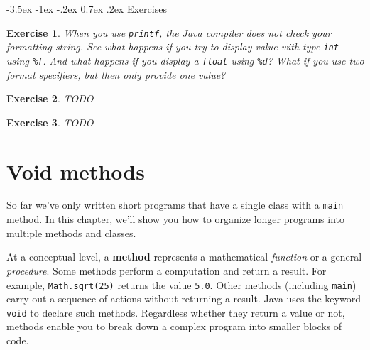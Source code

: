 \documentclass[12pt]{book}
\makeatletter
\theoremstyle{exercise}
\newtheorem{exercise}{Exercise}[chapter]
\newcommand{\java}[1]{\verb"#1"}
\renewcommand{\section}{\@startsection {section}{1}{\z@}%
    {-3.5ex \@plus -1ex \@minus -.2ex}%
    {0.7ex \@plus.2ex}%
    {\normalfont\Large\bfseries}}
\newcommand{\java}[1]{\lstinline{#1}} %
\makeatother
\begin{document}
\section{Exercises}


\begin{exercise}

When you use \java{printf}, the Java compiler does not check your formatting string.
See what happens if you try to display value with type \java{int} using \verb"%f".
And what happens if you display a \java{float} using \verb"%d"?
What if you use two format specifiers, but then only provide one value?

\end{exercise}


\begin{exercise}

TODO

\end{exercise}


\begin{exercise}

TODO

\end{exercise}


\chapter{Void methods}
\label{voidmeth}

So far we've only written short programs that have a single class with a \java{main} method.
In this chapter, we'll show you how to organize longer programs into multiple methods and classes.



At a conceptual level, a {\bf method} represents a mathematical {\em function} or a general {\em procedure}.
Some methods perform a computation and return a result.
For example, \java{Math.sqrt(25)} returns the value \java{5.0}.
Other methods (including \java{main}) carry out a sequence of actions without returning a result.
Java uses the keyword \java{void} to declare such methods.
Regardless whether they return a value or not, methods enable you to break down a complex program into smaller blocks of code.
\end{document}
